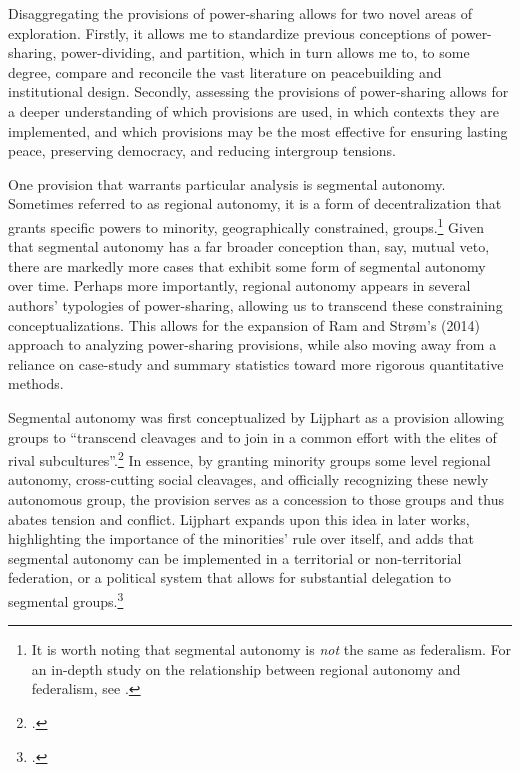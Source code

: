 \documentclass[12pt]{article}
\begin{document}
Disaggregating the provisions of power-sharing allows for two novel areas of exploration. Firstly, it allows me to standardize previous conceptions of power-sharing, power-dividing, and partition, which in turn allows me to, to some degree, compare and reconcile the vast literature on peacebuilding and institutional design. Secondly, assessing the provisions of power-sharing allows for a deeper understanding of which provisions are used, in which contexts they are implemented, and which provisions may be the most effective for ensuring lasting peace, preserving democracy, and reducing intergroup tensions. 

One provision that warrants particular analysis is segmental autonomy. Sometimes referred to as regional autonomy, it is a form of decentralization that grants specific powers to minority, geographically constrained, groups.\footnote{It is worth noting that segmental autonomy is \textit{not} the same as federalism. For an in-depth study on the relationship between regional autonomy and federalism, see \cite{lluch_autonomism_2012}.} Given that segmental autonomy has a far broader conception than, say, mutual veto, there are markedly more cases that exhibit some form of segmental autonomy over time. Perhaps more importantly, regional autonomy appears in several authors' typologies of power-sharing, allowing us to transcend these constraining conceptualizations. This allows for the expansion of Ram and Strøm’s (2014) approach to analyzing power-sharing provisions, while also moving away from a reliance on case-study and summary statistics toward more rigorous quantitative methods.

Segmental autonomy was first conceptualized by Lijphart as a provision allowing groups to ``transcend cleavages and to join in a common effort with the elites of rival subcultures''.\footcite[216]{lijphart_consociational_1969} In essence, by granting minority groups some level regional autonomy, cross-cutting social cleavages, and officially recognizing these newly autonomous group, the provision serves as a concession to those groups and thus abates tension and conflict. Lijphart expands upon this idea in later works, highlighting the importance of the minorities’ rule over itself, and adds that segmental autonomy can be implemented in a territorial or non-territorial federation, or a political system that allows for substantial delegation to segmental groups.\footcite{lijphart_consociational_1977, lijphart_non-majoritarian_1985} 
\end{document}
